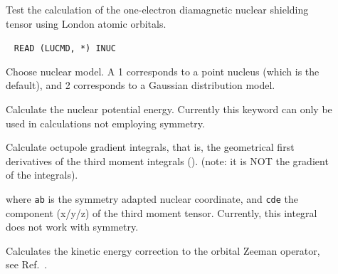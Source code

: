 \begin{description}
\item[] Test the calculation of the one-electron
diamagnetic  nuclear shielding
tensor using London atomic orbitals.

\item[]\verb| |\newline
\verb|READ (LUCMD, *) INUC|

Choose nuclear model. A 1 corresponds to a point nucleus (which is the
default), and 2 corresponds to a Gaussian distribution model.

\item[] Calculate the nuclear potential energy.
Currently this keyword can only be used in calculations not employing
symmetry.



\item[]
Calculate octupole gradient integrals, that is, the geometrical first
derivatives of the third moment integrals ().
(note: it is NOT the gradient of the  integrals).

where \verb|ab| is the symmetry adapted nuclear coordinate, and \verb|cde| the
component (x/y/z) of the third moment tensor. Currently, this integral
does not work with symmetry.

\item[] Calculates the kinetic energy correction to the
  orbital Zeeman operator, see Ref.~\cite{pmpljvkrjcp119}.



\end{description}
